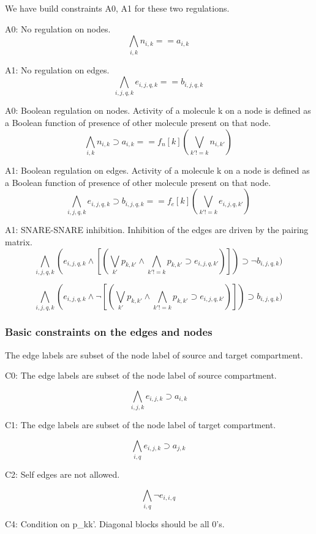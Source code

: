 We have build constraints A0, A1 for these two regulations. \newline

A0: No regulation on nodes.
\[ \bigwedge\limits_{i,k} n_{i,k} == a_{i,k} \, \]  

A1: No regulation on edges.
\[ \bigwedge\limits_{i,j,q,k} e_{i,j,q,k} == b_{i,j,q,k} \, \]  

A0: Boolean regulation on nodes. Activity of a molecule k on a node is defined as a Boolean function of presence of other molecule present on that node.
\[ \bigwedge\limits_{i,k} n_{i,k} \supset a_{i,k} ==   f_n[k] (\bigvee_{ k' != k} n_{i,k'}) \, \]  

A1: Boolean regulation on edges. Activity of a molecule k on a node is defined as a Boolean function of presence of other molecule present on that node.
\[ \bigwedge\limits_{i,j,q,k} e_{i,j,q,k} \supset b_{i,j,q,k} == f_e[k](\bigvee_{k' != k} e_{i,j,q,k'}) \, \]  

A1: SNARE-SNARE inhibition. Inhibition of the edges are driven by the pairing matrix.
\[ \bigwedge\limits_{i,j,q, k}  (e_{i,j,q,k} \land [ ( \bigvee_{k'} p_{k,k'} \land \bigwedge_{k' != k} p_{k,k'} \supset e_{i,j,q,k'})] ) \supset \neg b_{i,j,q,k}) \, \]  

\[ \bigwedge\limits_{i,j, q, k}  (e_{i,j,q,k} \land \neg [ ( \bigvee_{k'} p_{k,k'} \land \bigwedge_{k' != k} p_{k,k'} \supset e_{i,j,q,k'})] ) \supset b_{i,j,q,k}) \, \]  

\subsubsection{Basic constraints on the edges and nodes}
The edge labels are subset of the node label of source and target compartment. \newline

C0: The edge labels are subset of the node label of source compartment.

\[ \bigwedge\limits_{i,j,k} e_{i,j,k} \supset a_{i,k} \, \]  

C1: The edge labels are subset of the node label of target compartment.

\[ \bigwedge\limits_{i,q}  e_{i,j,k} \supset a_{j,k} \, \]  

C2: Self edges are not allowed. 

\[  \bigwedge\limits_{i,q} \neg e_{i,i,q} \, \]

C4: Condition on p\_kk'. Diagonal blocks should be all 0's.

